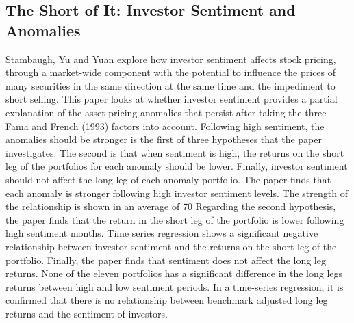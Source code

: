 \documentclass[a4paper]{article}                 %
\begin{document}
\subsection{The Short of It: Investor Sentiment and Anomalies}
Stambaugh, Yu and Yuan explore how investor sentiment affects stock pricing, through a market-wide component with the potential to influence the prices of many securities in the same direction at the same time and the impediment to short selling. This paper looks at whether investor sentiment provides a partial explanation of the asset pricing anomalies that persist after taking the three Fama and French (1993) factors into account.
Following high sentiment, the anomalies should be stronger is the first of three hypotheses that the paper investigates. The second is that when sentiment is high, the returns on the short leg of the portfolios for each anomaly should be lower. Finally, investor sentiment should not affect the long leg of each anomaly portfolio. 
The paper finds that each anomaly is stronger following high investor sentiment levels. The strength of the relationship is shown in an average of 70%
Regarding the second hypothesis, the paper finds that the return in the short leg of the portfolio is lower following high sentiment months. Time series regression shows a significant negative relationship between investor sentiment and the returns on the short leg of the portfolio.
Finally, the paper finds that sentiment does not affect the long leg returns. None of the eleven portfolios has a significant difference in the long legs returns between high and low sentiment periods. In a time-series regression, it is confirmed that there is no relationship between benchmark adjusted long leg returns and the sentiment of investors.
\end{document}
